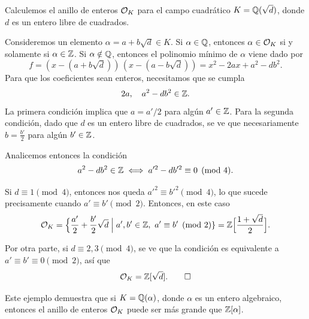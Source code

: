 \begin{ejemplo}
  Calculemos el anillo de enteros $\mathcal{O}_K$ para el campo cuadrático
  $K = \mathbb{Q} (\sqrt{d})$, donde $d$ es un entero libre de cuadrados.

  Consideremos un elemento $\alpha = a + b\sqrt{d} \in K$.
  Si $\alpha \in \mathbb{Q}$, entonces $\alpha \in \mathcal{O}_K$ si y solamente si
  $\alpha \in \mathbb{Z}$. Si $\alpha \notin \mathbb{Q}$, entonces el polinomio mínimo de
  $\alpha$ viene dado por
  $$f = (x - (a + b\sqrt{d}))\,(x - (a - b\sqrt{d})) = x^2 - 2ax + a^2 - db^2.$$
  Para que los coeficientes sean enteros, necesitamos que se cumpla
  $$2a, \quad a^2 - db^2 \in \mathbb{Z}.$$
  La primera condición implica que $a = a'/2$ para algún $a' \in \mathbb{Z}$.
  Para la segunda condición, dado que $d$ es un entero libre de cuadrados,
  se ve que necesariamente $b = \frac{b'}{2}$ para algún $b' \in \mathbb{Z}$.

  Analicemos entonces la condición
  $$a^2 - db^2 \in \mathbb{Z} \iff a'^2 - db'^2 \equiv 0 \pmod{4}.$$

  Si $d \equiv 1 \pmod{4}$, entonces nos queda $a'^2 \equiv b'^2 \pmod{4}$,
  lo que sucede precisamente cuando $a' \equiv b' \pmod{2}$.
  Entonces, en este caso
  \[ \mathcal{O}_K = \Bigl\{ \frac{a'}{2} + \frac{b'}{2}\sqrt{d} \Bigm|
                    a', b' \in \mathbb{Z}, ~ a'\equiv b' \pmod{2} \}
          = \mathbb{Z} \Bigl[\frac{1+\sqrt{d}}{2}\Bigr]. \]

  Por otra parte, si $d \equiv 2,3 \pmod{4}$, se ve que la condición es
  equivalente a $a' \equiv b' \equiv 0 \pmod{2}$, así que
  \[ \mathcal{O}_K = \mathbb{Z} [\sqrt{d}]. \qedhere \]
\end{ejemplo}

Este ejemplo demuestra que si $K = \mathbb{Q} (\alpha)$, donde $\alpha$ es un entero
algebraico, entonces el anillo de enteros $\mathcal{O}_K$ puede ser más grande que
$\mathbb{Z} [\alpha]$.


